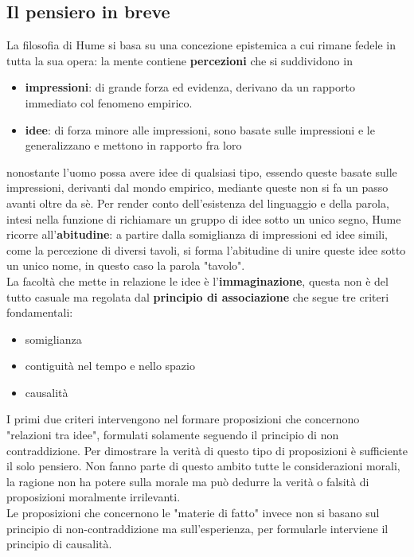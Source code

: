 \documentclass[10pt,a4paper]{article}
\begin{document}
\subsection{Il pensiero in breve}
La filosofia di Hume si basa su una concezione epistemica a cui rimane fedele in tutta la sua opera: la mente contiene \textbf{percezioni} che si suddividono in 
\begin{itemize}
	\item \textbf{impressioni}: di grande forza ed evidenza, derivano da un rapporto immediato col fenomeno empirico.
	\item \textbf{idee}: di forza minore alle impressioni, sono basate sulle impressioni e le generalizzano e mettono in rapporto fra loro
\end{itemize}
nonostante l'uomo possa avere idee di qualsiasi tipo, essendo queste basate sulle impressioni, derivanti dal mondo empirico, mediante queste non si fa un passo avanti oltre da sè. Per render conto dell'esistenza del linguaggio e della parola, intesi nella funzione di richiamare un gruppo di idee sotto un unico segno, Hume ricorre all'\textbf{abitudine}: a partire dalla somiglianza di impressioni ed idee simili, come la percezione di diversi tavoli, si forma l'abitudine di unire queste idee sotto un unico nome, in questo caso la parola "tavolo".\\
La facoltà che mette in relazione le idee è l'\textbf{immaginazione}, questa non è del tutto casuale ma regolata dal \textbf{principio di associazione} che segue tre criteri fondamentali:
\begin{itemize}
	\item somiglianza
	\item contiguità nel tempo e nello spazio
	\item causalità
\end{itemize}
I primi due criteri intervengono nel formare proposizioni che concernono "relazioni tra idee", formulati solamente seguendo il principio di non contraddizione. Per dimostrare la verità di questo tipo di proposizioni è sufficiente il solo pensiero. Non fanno parte di questo ambito tutte le considerazioni morali, la ragione non ha potere sulla morale ma può dedurre la verità o falsità di proposizioni moralmente irrilevanti.\\ Le proposizioni che concernono le "materie di fatto" invece non si basano sul principio di non-contraddizione ma sull'esperienza, per formularle interviene il principio di causalità.\\
\end{document}
